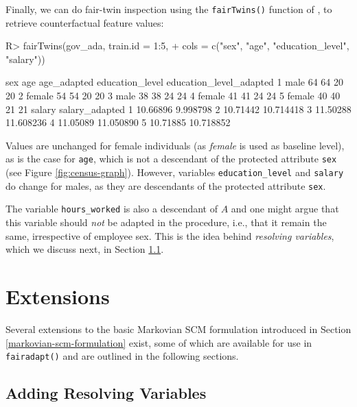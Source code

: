 \documentclass[
  nojss]{jss}
\begin{document}
Finally, we can do fair-twin inspection using the \texttt{fairTwins()}
function of , to retrieve counterfactual feature values:

\begin{CodeChunk}
\begin{CodeInput}
R> fairTwins(gov_ada, train.id = 1:5,
+           cols = c("sex", "age", "education_level", "salary"))
\end{CodeInput}
\begin{CodeOutput}
     sex age age_adapted education_level education_level_adapted
1   male  64          64              20                      20
2 female  54          54              20                      20
3   male  38          38              24                      24
4 female  41          41              24                      24
5 female  40          40              21                      21
    salary salary_adapted
1 10.66896       9.998798
2 10.71442      10.714418
3 11.50288      11.608236
4 11.05089      11.050890
5 10.71885      10.718852
\end{CodeOutput}
\end{CodeChunk}

Values are unchanged for female individuals (as \emph{female} is used as
baseline level), as is the case for \texttt{age}, which is not a
descendant of the protected attribute \texttt{sex} (see Figure
\ref{fig:census-graph}). However, variables \texttt{education\_level}
and \texttt{salary} do change for males, as they are descendants of the
protected attribute \texttt{sex}.

The variable \texttt{hours\_worked} is also a descendant of \(A\) and
one might argue that this variable should \emph{not} be adapted in the
procedure, i.e., that it remain the same, irrespective of employee sex.
This is the idea behind \emph{resolving variables}, which we discuss
next, in Section \ref{adding-resolving-variables}.

\hypertarget{extensions}{%
\section{Extensions}\label{extensions}}

Several extensions to the basic Markovian SCM formulation introduced in
Section \ref{markovian-scm-formulation} exist, some of which are
available for use in \texttt{fairadapt()} and are outlined in the
following sections.

\hypertarget{adding-resolving-variables}{%
\subsection{Adding Resolving
Variables}\label{adding-resolving-variables}}
\end{document}

